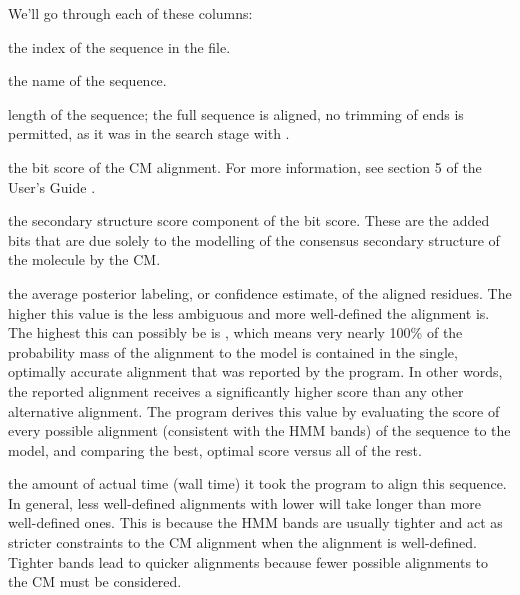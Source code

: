 We'll go through each of these columns:

\begin{wideitem}
\item[\emprog{seq idx}] the index of the sequence in the file.

\item[\emprog{seq name}] the name of the sequence.

\item[\emprog{len}] length of the sequence; the full sequence is
  aligned, no trimming of ends is permitted, as it was in the search
  stage with .

\item[\emprog{total}] the bit score of the CM alignment. For more
  information, see section 5 of the  User's Guide \cite{Nawrocki09}.

\item[\emprog{struct}] the secondary structure score component of the
   bit score. These are the added bits that are due solely
  to the modelling of the consensus secondary structure of the
  molecule by the CM\@. 
  
\item[\emprog{avg prob}] the average posterior labeling, or confidence
  estimate, of the aligned residues. The higher this value is the less
  ambiguous and more well-defined the alignment is. The highest this
  can possibly be is , which means very nearly 100\% of
  the probability mass of the alignment to the model is contained in
  the single, optimally accurate alignment that was reported by the
  program. In other words, the reported alignment receives a
  significantly higher score than any other alternative alignment. The
  program derives this value by evaluating the score of every possible
  alignment (consistent with the HMM bands) of the sequence to the
  model, and comparing the best, optimal score versus all of the
  rest. 

\item[\emprog{elapsed}] the amount of actual time (wall time) it took
  the program to align this sequence. In general, less well-defined
  alignments with lower  will take longer than more
  well-defined ones. This is because the HMM bands are usually tighter
  and act as stricter constraints to the CM alignment when the
  alignment is well-defined. Tighter bands lead to quicker alignments
  because fewer possible alignments to the CM must be considered.
\end{wideitem}

